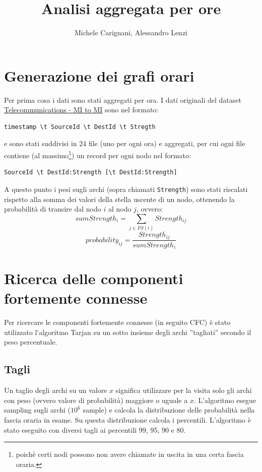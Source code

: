 \documentclass[10pt,a4paper]{article}
\author{Michele Carignani, Alessandro Lenzi}
\title{Analisi aggregata per ore}
\begin{document}
\maketitle

\section{Generazione dei grafi orari}

Per prima cosa i dati sono stati aggregati per ora. I dati originali del dataset 
\href{https://dandelion.eu/datagem/telecom-mi-to-mi/description/}{Telecommunications - MI to MI} sono nel formato:
\begin{verbatim}
timestamp \t SourceId \t DestId \t Stregth
\end{verbatim}
e sono stati suddivisi in 24 file (uno per ogni ora) e aggregati, per cui
ogni file contiene (al massimo\footnote{poichè certi nodi possono non avere chiamate in uscita
in una certa fascia oraria.}) un record per ogni nodo nel formato:
\begin{verbatim}
SourceId \t DestId:Strength [\t DestId:Strength]
\end{verbatim}

A questo punto i pesi sugli archi (sopra chiamati \verb!Strength!) sono stati riscalati rispetto alla somma
dei valori della stella uscente di un nodo, ottenendo la probabilità di transire dal nodo $i$ al 
nodo $j$, ovvero:
$$ sumStrength_i = \sum_{j \in FS(i)} Strength_{ij} $$
$$ probability_{ij} = \frac{Strength_{ij}}{sumStrength_i} $$

\section{Ricerca delle componenti fortemente connesse}

Per ricercare le componenti fortemente connesse (in seguito CFC) è stato utilizzato l'algoritmo Tarjan
su un sotto insieme degli archi ''tagliati'' secondo il peso percentuale.

\subsection{Tagli}
Un taglio degli archi su un valore $x$ significa utilizzare per la visita solo gli archi con peso (ovvero valore di probabilità) maggiore o uguale a $x$. 
L'algoritmo esegue sampling sugli archi ($10^6$ sample) e calcola la distribuzione delle probabilità nella fascia oraria in esame. Su questa distribuzione calcola i percentili. L'algoritmo è stato eseguito con diversi tagli ai percentili 99, 95, 90 e 80.
\end{document}

